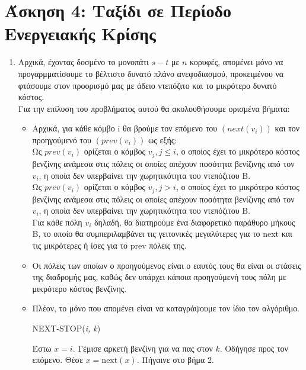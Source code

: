 \documentclass{article}
\begin{document}
\section*{\large Άσκηση 4: Ταξίδι σε Περίοδο Ενεργειακής Κρίσης}
 \begin{enumerate}
\item Αρχικά, έχοντας δοσμένο το μονοπάτι $s - t$ με $n$ κορυφές, απομένει μόνο να προγαρμματίσουμε το βέλτιστο δυνατό πλάνο ανεφοδιασμού, προκειμένου να φτάσουμε στον προορισμό μας με άδειο ντεπόζιτο και το μικρότερο δυνατό κόστος. \\
Για την επίλυση του προβλήματος αυτού θα ακολουθήσουμε ορισμένα βήματα:
\begin{itemize}
\item Αρχικά, για κάθε κόμβο i θα βρούμε τον επόμενο του $(next(v_i))$ και τον προηγούμενό του $(prev(v_i))$ ως εξής: \\ 
Ως $prev(v_i)$ ορίζεται ο κόμβος $v_j, j \leq i$, ο οποίος έχει το μικρότερο κόστος βενζίνης ανάμεσα στις πόλεις οι οποίες απέχουν ποσότητα βενίζινης από τον $v_i$, η οποία δεν υπερβαίνει την χωρητικότητα του ντεπόζιτου Β. 
\\
Ως $prev(v_i)$ ορίζεται ο κόμβος $v_j, j > i$, ο οποίος έχει το μικρότερο κόστος βενζίνης ανάμεσα στις πόλεις οι οποίες απέχουν ποσότητα βενίζινης από τον $v_i$, η οποία δεν υπερβαίνει την χωρητικότητα του ντεπόζιτου Β. 
\\
Για κάθε πόλη $v_i$ δηλαδή, θα διατηρούμε ένα διαφορετικό παράθυρο μήκους B, το οποίο θα συμπεριλαμβάνει τις γειτονικές μεγαλύτερες για το next και τις μικρότερες ή ίσες για το prev πόλεις της. 
\item Οι πόλεις των οποίων ο προηγούμενος είναι ο εαυτός τους θα είναι οι στάσεις της διαδρομής μας, καθώς δεν υπάρχει κάποια προηγούμενή τους πόλη με μικρότερο κόστος βενζίνης. 
\item Πλέον, το μόνο που απομένει είναι να καταγράψουμε τον ίδιο τον αλγόριθμο.

\begin{algorithm}[H]
\caption{NEXT-STOP(\textit{i, k})}
\begin{algorithmic}[2]
    \State Έστω \( x = i \).
        \State Γέμισε αρκετή βενζίνη για να πας στον \( k \).
    \Else
        \State Οδήγησε προς τον επόμενο.
        \State Θέσε \( x = \text{next}(x) \).
        \State Πήγαινε στο βήμα 2.
    \EndIf
\end{algorithmic}
\end{algorithm}


\end{itemize}
\end{enumerate}
\end{document}
